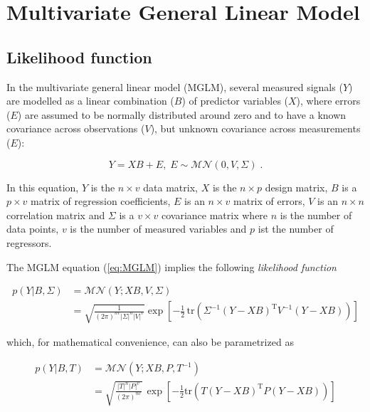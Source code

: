 

\setcounter{equation}{0}
\section{Multivariate General Linear Model} \label{sec:MGLM}

\subsection{Likelihood function} \label{sec:MGLM-LF}

In the multivariate general linear model (MGLM), several measured signals ($Y$) are modelled as a linear combination ($B$) of predictor variables ($X$), where errors ($E$) are assumed to be normally distributed around zero and to have a known covariance across observations ($V$), but unknown covariance across measurements ($E$):

\begin{equation} \label{eq:MGLM}
Y = X B + E, \; E \sim \mathcal{MN}(0, V, \Sigma) \; .
\end{equation}

In this equation, $Y$ is the $n \times v$ data matrix, $X$ is the $n \times p$ design matrix, $B$ is a $p \times v$ matrix of regression coefficients, $E$ is an $n \times v$ matrix of errors, $V$ is an $n \times n$ correlation matrix and $\Sigma$ is a $v \times v$ covariance matrix where $n$ is the number of data points, $v$ is the number of measured variables and $p$ ist the number of regressors.

The MGLM equation (\ref{eq:MGLM}) implies the following \textit{likelihood function}

\begin{equation} \label{eq:MGLM-LF-class}
\begin{split}
p(Y|B,\Sigma) &= \mathcal{MN}(Y; XB, V, \Sigma) \\
&= \sqrt{\frac{1}{(2\pi)^{nv} |\Sigma|^n |V|^v}} \exp\left[ -\frac{1}{2} \, \mathrm{tr}\left( \Sigma^{-1} (Y - XB)^\mathrm{T} V^{-1} (Y - XB) \right)  \right]
\end{split}
\end{equation}

which, for mathematical convenience, can also be parametrized as

\begin{equation} \label{eq:MGLM-LF-Bayes}
\begin{split}
p(Y|B,T) &= \mathcal{MN}(Y; X B, P, T^{-1}) \\
&= \sqrt{\frac{|T|^n |P|^v}{(2 \pi)^{nv}}} \, \exp\left[ -\frac{1}{2} \mathrm{tr}\left( T (Y-XB)^\mathrm{T} P (Y-XB) \right) \right]
\end{split}
\end{equation}

